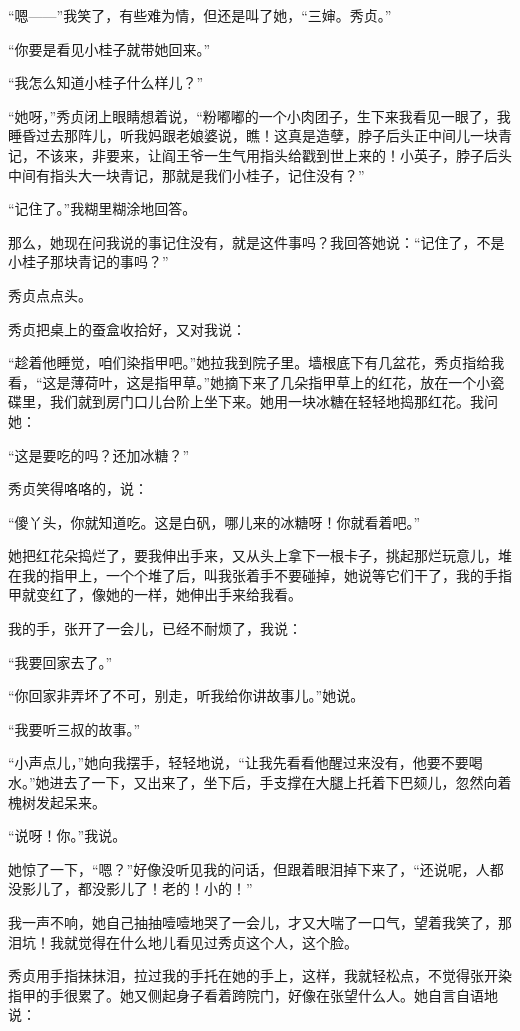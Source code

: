 \par “嗯——”我笑了，有些难为情，但还是叫了她，“三婶。秀贞。”
\par “你要是看见小桂子就带她回来。”
\par “我怎么知道小桂子什么样儿？”
\par “她呀，”秀贞闭上眼睛想着说，“粉嘟嘟的一个小肉团子，生下来我看见一眼了，我睡昏过去那阵儿，听我妈跟老娘婆说，瞧！这真是造孽，脖子后头正中间儿一块青记，不该来，非要来，让阎王爷一生气用指头给戳到世上来的！小英子，脖子后头中间有指头大一块青记，那就是我们小桂子，记住没有？”
\par “记住了。”我糊里糊涂地回答。
\par 那么，她现在问我说的事记住没有，就是这件事吗？我回答她说：“记住了，不是小桂子那块青记的事吗？”
\par 秀贞点点头。
\par 秀贞把桌上的蚕盒收拾好，又对我说：
\par “趁着他睡觉，咱们染指甲吧。”她拉我到院子里。墙根底下有几盆花，秀贞指给我看，“这是薄荷叶，这是指甲草。”她摘下来了几朵指甲草上的红花，放在一个小瓷碟里，我们就到房门口儿台阶上坐下来。她用一块冰糖在轻轻地捣那红花。我问她：
\par “这是要吃的吗？还加冰糖？”
\par 秀贞笑得咯咯的，说：
\par “傻丫头，你就知道吃。这是白矾，哪儿来的冰糖呀！你就看着吧。”
\par 她把红花朵捣烂了，要我伸出手来，又从头上拿下一根卡子，挑起那烂玩意儿，堆在我的指甲上，一个个堆了后，叫我张着手不要碰掉，她说等它们干了，我的手指甲就变红了，像她的一样，她伸出手来给我看。
\par 我的手，张开了一会儿，已经不耐烦了，我说：
\par “我要回家去了。”
\par “你回家非弄坏了不可，别走，听我给你讲故事儿。”她说。
\par “我要听三叔的故事。”
\par “小声点儿，”她向我摆手，轻轻地说，“让我先看看他醒过来没有，他要不要喝水。”她进去了一下，又出来了，坐下后，手支撑在大腿上托着下巴颏儿，忽然向着槐树发起呆来。
\par “说呀！你。”我说。
\par 她惊了一下，“嗯？”好像没听见我的问话，但跟着眼泪掉下来了，“还说呢，人都没影儿了，都没影儿了！老的！小的！”
\par 我一声不响，她自己抽抽噎噎地哭了一会儿，才又大喘了一口气，望着我笑了，那泪坑！我就觉得在什么地儿看见过秀贞这个人，这个脸。
\par 秀贞用手指抹抹泪，拉过我的手托在她的手上，这样，我就轻松点，不觉得张开染指甲的手很累了。她又侧起身子看着跨院门，好像在张望什么人。她自言自语地说：
